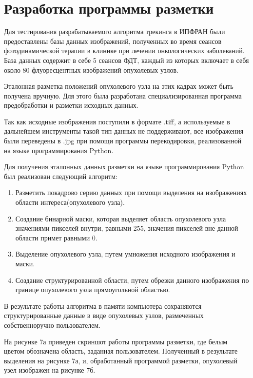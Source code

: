 \documentclass[a4paper,14pt]{extarticle}
\begin{document}
\newpage
\section{Разработка программы разметки}
Для тестирования разрабатываемого алгоритма трекинга в ИПФРАН были предоставлены базы данных изображений, полученных во время сеансов фотодинамической терапии в клинике при лечении онкологических заболеваний. База данных содержит в себе 5 сеансов ФДТ, каждый из которых включает в себя около 80 флуоресцентных изображений опухолевых узлов. 


Эталонная разметка положений опухолевого узла на этих кадрах может быть получена вручную. Для этого была разработана специализированная программа предобработки и разметки исходных данных. 


Так как исходные изображения поступили в формате .tiff, а используемые в дальнейшем инструменты такой тип данных не поддерживают, все изображения были переведены в .jpg при помощи программы перекодировки, реализованной на языке программирования Python. 


Для получения эталонных данных разметки на языке программирования Python был реализован следующий алгоритм:


\begin{enumerate}
    \item Разметить покадрово серию данных при помощи выделения на изображениях области интереса(опухолевого узла).
    \item Создание бинарной маски, которая выделяет область опухолевого узла значениями пикселей внутри, равными 255, значения пикселей вне данной области примет равными 0.
    \item Выделение опухолевого узла, путем умножения исходного изображения и маски.
    \item Создание структурированной области, путем обрезки данного изображения по границе опухолевого узла прямоугольной областью.
\end{enumerate}

В результате работы алгоритма в памяти компьютера сохраняются структурированные данные в виде опухолевых узлов, размеченных собственноручно пользователем. 

На рисунке 7а приведен скриншот работы программы разметки, где белым цветом обозначена область, заданная пользователем. Полученный в результате выделения на рисунке 7а, и, обработанный программой разметки, опухолевый узел изображен на рисунке 7б.
\end{document}
